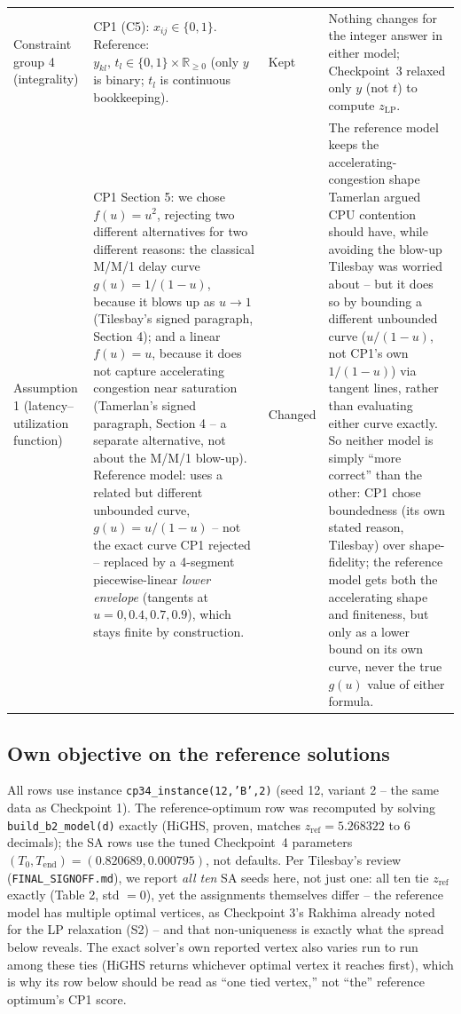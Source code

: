 \documentclass[11pt,a4paper]{article}
\newcommand{\zref}{z_{\mathrm{ref}}}
\newcommand{\zLP}{z_{\mathrm{LP}}}
\begin{document}
{\begin{tabularx}{\textwidth}{@{}p{2.6cm}Xp{1.7cm}X@{}}
Constraint group 4 (integrality) & CP1 (C5): $x_{ij}\in\{0,1\}$. Reference: $y_{kl},\,t_l\in\{0,1\}\times\mathbb{R}_{\ge0}$ (only $y$ is binary; $t_l$ is continuous bookkeeping). & Kept & Nothing changes for the integer answer in either model; Checkpoint~3 relaxed only $y$ (not $t$) to compute $\zLP$.\\
Assumption 1 (latency--utilization function) & CP1 Section 5: we chose $f(u)=u^2$, rejecting two different alternatives for two different reasons: the classical M/M/1 delay curve $g(u)=1/(1-u)$, because it blows up as $u\to1$ (Tilesbay's signed paragraph, Section 4); and a linear $f(u)=u$, because it does not capture accelerating congestion near saturation (Tamerlan's signed paragraph, Section 4 -- a separate alternative, not about the M/M/1 blow-up). Reference model: uses a related but different unbounded curve, $g(u)=u/(1-u)$ -- not the exact curve CP1 rejected -- replaced by a 4-segment piecewise-linear \emph{lower envelope} (tangents at $u=0,0.4,0.7,0.9$), which stays finite by construction. & Changed & The reference model keeps the accelerating-congestion shape Tamerlan argued CPU contention should have, while avoiding the blow-up Tilesbay was worried about -- but it does so by bounding a different unbounded curve ($u/(1-u)$, not CP1's own $1/(1-u)$) via tangent lines, rather than evaluating either curve exactly. So neither model is simply ``more correct'' than the other: CP1 chose boundedness (its own stated reason, Tilesbay) over shape-fidelity; the reference model gets both the accelerating shape and finiteness, but only as a lower bound on its own curve, never the true $g(u)$ value of either formula.\\
\bottomrule
\end{tabularx}}

\subsection*{Own objective on the reference solutions}
All rows use instance \texttt{cp34\_instance(12,'B',2)} (seed 12, variant 2 -- the same data as Checkpoint 1). The reference-optimum row was recomputed by solving \texttt{build\_b2\_model(d)} exactly (HiGHS, proven, matches $\zref=5.268322$ to 6 decimals); the SA rows use the tuned Checkpoint~4 parameters $(T_0,T_{\mathrm{end}})=(0.820689,0.000795)$, not defaults. Per Tilesbay's review (\texttt{FINAL\_SIGNOFF.md}), we report \emph{all ten} SA seeds here, not just one: all ten tie $\zref$ exactly (Table 2, std $=0$), yet the assignments themselves differ -- the reference model has multiple optimal vertices, as Checkpoint 3's Rakhima already noted for the LP relaxation (S2) -- and that non-uniqueness is exactly what the spread below reveals. The exact solver's own reported vertex also varies run to run among these ties (HiGHS returns whichever optimal vertex it reaches first), which is why its row below should be read as ``one tied vertex,'' not ``the'' reference optimum's CP1 score.
\end{document}
